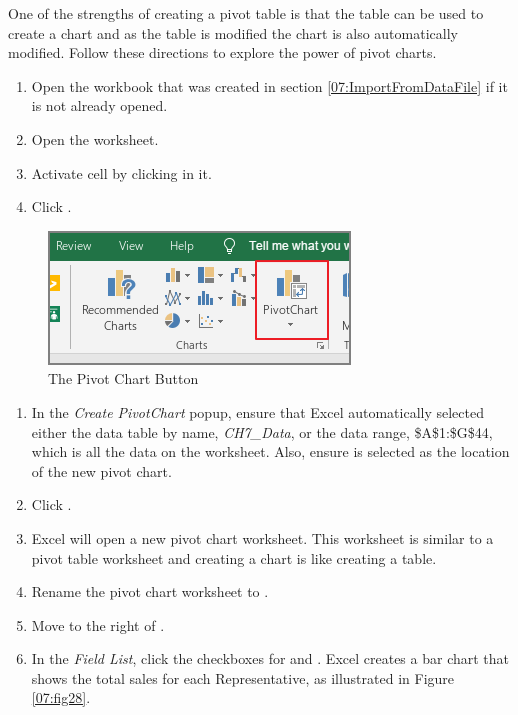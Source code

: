 One of the strengths of creating a pivot table is that the table can be used to create a chart and as the table is modified the chart is also automatically modified. Follow these directions to explore the power of pivot charts.

\begin{enumerate}
	\item Open the  workbook that was created in section \ref{07:ImportFromDataFile} if it is not already opened.
	\item Open the  worksheet.
	\item Activate cell  by clicking in it.  
	\item Click .
\end{enumerate}

\begin{figure}[H]
	\centering
	\includegraphics[width=\maxwidth{.95\linewidth}]{gfx/ch07_fig27}
	\caption{The Pivot Chart Button}
	\label{07:fig27}
\end{figure}

\begin{enumerate}[resume]	
	\item In the \textit{Create PivotChart} popup, ensure that Excel automatically selected either the data table by name, \textit{CH7\_Data}, or the data range, \$A\$1:\$G\$44, which is all the data on the worksheet. Also, ensure  is selected as the location of the new pivot chart.
	\item Click .
	\item Excel will open a new pivot chart worksheet. This worksheet is similar to a pivot table worksheet and creating a chart is like creating a table.
	\item Rename the pivot chart worksheet to . 
	\item Move  to the right of .
	\item In the \textit{Field List}, click the checkboxes for  and . Excel creates a bar chart that shows the total sales for each Representative, as illustrated in Figure \ref{07:fig28}.
\end{enumerate}	

